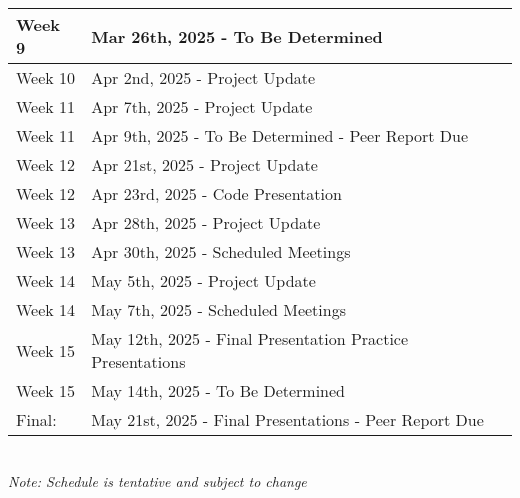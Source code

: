 \begin{tabular}{ | l | l |  }
    \hline
    Week 9 & Mar 26th, 2025 - To Be Determined \\ 
    \hline
    Week 10 & Apr 2nd, 2025 - Project Update \\ 
    \hline
    Week 11 & Apr 7th, 2025 - Project Update \\ 
    \hline
    Week 11 & Apr 9th, 2025 - To Be Determined - Peer Report Due \\ 
    \hline
    Week 12 & Apr 21st, 2025 - Project Update \\
    \hline
    Week 12 & Apr 23rd, 2025 - Code Presentation \\
    \hline
    Week 13 & Apr 28th, 2025 - Project Update \\
    \hline
    Week 13 & Apr 30th, 2025 - Scheduled Meetings \\
    \hline
    Week 14 & May 5th, 2025 - Project Update \\
    \hline
    Week 14 & May 7th, 2025 - Scheduled Meetings \\
    \hline
    Week 15 & May 12th, 2025 - Final Presentation Practice Presentations \\
    \hline
    Week 15 & May 14th, 2025 - To Be Determined \\
    \hline
    Final: & May 21st, 2025 - Final Presentations - Peer Report Due \\
    \hline
\end{tabular}
\\
\textit{Note: Schedule is tentative and subject to change}
    
